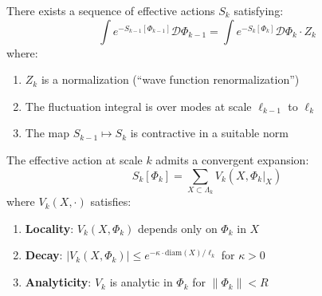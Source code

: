 \begin{theorem}
\label{thm:rg-map}
There exists a sequence of effective actions $S_k$ satisfying:
\[
\int e^{-S_{k-1}[\Phi_{k-1}]} \mathcal{D}\Phi_{k-1} = \int e^{-S_k[\Phi_k]} \mathcal{D}\Phi_k \cdot Z_k
\]
where:
\begin{enumerate}
\item $Z_k$ is a normalization (``wave function renormalization'')
\item The fluctuation integral is over modes at scale $\ell_{k-1}$ to $\ell_k$
\item The map $S_{k-1} \mapsto S_k$ is contractive in a suitable norm
\end{enumerate}
\end{theorem}

\begin{theorem}
\label{thm:multiscale-cluster}
The effective action at scale $k$ admits a convergent expansion:
\[
S_k[\Phi_k] = \sum_{X \subset \Lambda_k} V_k(X, \Phi_k|_X)
\]
where $V_k(X, \cdot)$ satisfies:
\begin{enumerate}
\item \textbf{Locality}: $V_k(X, \Phi_k)$ depends only on $\Phi_k$ in $X$
\item \textbf{Decay}: $|V_k(X, \Phi_k)| \leq e^{-\kappa \cdot \text{diam}(X)/\ell_k}$ for $\kappa > 0$
\item \textbf{Analyticity}: $V_k$ is analytic in $\Phi_k$ for $\|\Phi_k\| < R$
\end{enumerate}
\end{theorem}

